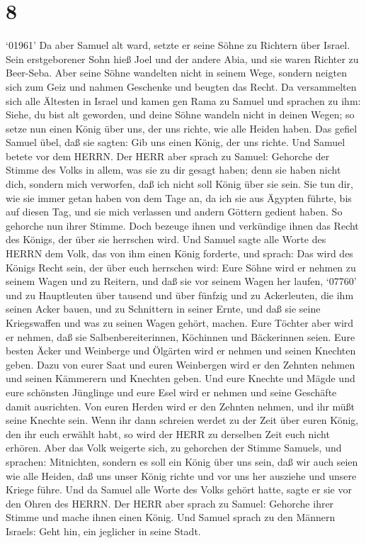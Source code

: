 \hypertarget{section-7}{%
\section{8}\label{section-7}}

 `01961' Da aber Samuel alt ward, setzte er seine Söhne zu
Richtern über Israel.  Sein erstgeborener Sohn hieß Joel und
der andere Abia, und sie waren Richter zu Beer-Seba.  Aber
seine Söhne wandelten nicht in seinem Wege, sondern neigten sich zum
Geiz und nahmen Geschenke und beugten das Recht.  Da
versammelten sich alle Ältesten in Israel und kamen gen Rama zu Samuel
 und sprachen zu ihm: Siehe, du bist alt geworden, und deine
Söhne wandeln nicht in deinen Wegen; so setze nun einen König über uns,
der uns richte, wie alle Heiden haben.  Das gefiel Samuel
übel, daß sie sagten: Gib uns einen König, der uns richte. Und Samuel
betete vor dem HERRN.  Der HERR aber sprach zu Samuel:
Gehorche der Stimme des Volks in allem, was sie zu dir gesagt haben;
denn sie haben nicht dich, sondern mich verworfen, daß ich nicht soll
König über sie sein.  Sie tun dir, wie sie immer getan haben
von dem Tage an, da ich sie aus Ägypten führte, bis auf diesen Tag, und
sie mich verlassen und andern Göttern gedient haben.  So
gehorche nun ihrer Stimme. Doch bezeuge ihnen und verkündige ihnen das
Recht des Königs, der über sie herrschen wird.  Und Samuel
sagte alle Worte des HERRN dem Volk, das von ihm einen König forderte,
 und sprach: Das wird des Königs Recht sein, der über euch
herrschen wird: Eure Söhne wird er nehmen zu seinem Wagen und zu
Reitern, und daß sie vor seinem Wagen her laufen,  `07760'
und zu Hauptleuten über tausend und über fünfzig und zu Ackerleuten, die
ihm seinen Acker bauen, und zu Schnittern in seiner Ernte, und daß sie
seine Kriegswaffen und was zu seinen Wagen gehört, machen. 
Eure Töchter aber wird er nehmen, daß sie Salbenbereiterinnen, Köchinnen
und Bäckerinnen seien.  Eure besten Äcker und Weinberge und
Ölgärten wird er nehmen und seinen Knechten geben.  Dazu
von eurer Saat und euren Weinbergen wird er den Zehnten nehmen und
seinen Kämmerern und Knechten geben.  Und eure Knechte und
Mägde und eure schönsten Jünglinge und eure Esel wird er nehmen und
seine Geschäfte damit ausrichten.  Von euren Herden wird er
den Zehnten nehmen, und ihr müßt seine Knechte sein.  Wenn
ihr dann schreien werdet zu der Zeit über euren König, den ihr euch
erwählt habt, so wird der HERR zu derselben Zeit euch nicht erhören.
 Aber das Volk weigerte sich, zu gehorchen der Stimme
Samuels, und sprachen: Mitnichten, sondern es soll ein König über uns
sein,  daß wir auch seien wie alle Heiden, daß uns unser
König richte und vor uns her ausziehe und unsere Kriege führe.
 Und da Samuel alle Worte des Volks gehört hatte, sagte er
sie vor den Ohren des HERRN.  Der HERR aber sprach zu
Samuel: Gehorche ihrer Stimme und mache ihnen einen König. Und Samuel
sprach zu den Männern Israels: Geht hin, ein jeglicher in seine Stadt.


